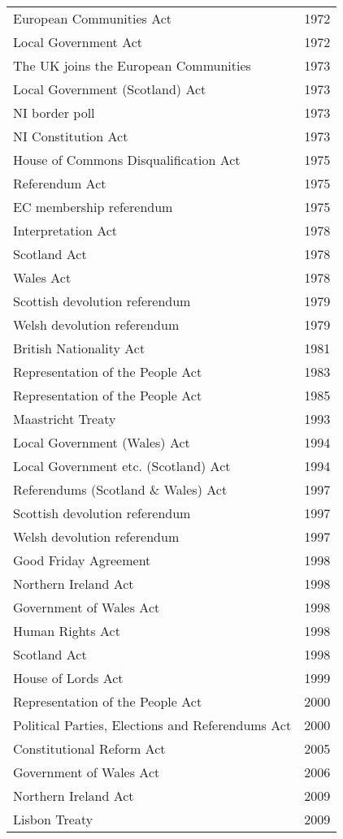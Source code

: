 \documentclass[14pt,titlepage]{extarticle}
\begin{document}
{\begin{longtable}{l l}
European Communities Act & 1972\\
Local Government Act & 1972\\
The UK joins the European Communities & 1973\\
Local Government (Scotland) Act & 1973\\
NI border poll & 1973\\
NI Constitution Act & 1973\\
House of Commons Disqualification Act & 1975\\
Referendum Act & 1975\\
EC membership referendum & 1975\\
Interpretation Act & 1978\\
Scotland Act  & 1978\\
Wales Act  & 1978\\
Scottish devolution referendum & 1979\\
Welsh devolution referendum & 1979\\
British Nationality Act  & 1981\\
Representation of the People Act  & 1983\\
Representation of the People Act  & 1985\\
Maastricht Treaty & 1993\\
Local Government (Wales) Act & 1994\\
Local Government etc. (Scotland) Act & 1994\\
Referendums (Scotland \& Wales) Act & 1997\\
Scottish devolution referendum & 1997\\
Welsh devolution referendum & 1997\\
Good Friday Agreement & 1998\\
Northern Ireland Act & 1998\\
Government of Wales Act & 1998\\
Human Rights Act & 1998\\
Scotland Act & 1998\\
House of Lords Act & 1999\\
Representation of the People Act  & 2000\\
Political Parties, Elections and Referendums Act & 2000\\
Constitutional Reform Act & 2005\\
Government of Wales Act  & 2006\\
Northern Ireland Act  & 2009\\
Lisbon Treaty & 2009\\

\end{longtable}}
\end{document}
